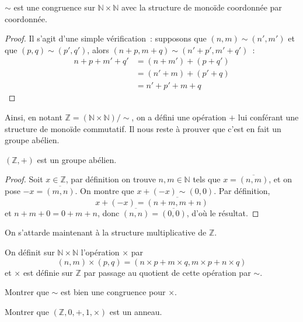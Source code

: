 \begin{proposition}
  $\sim$ est une congruence sur $\mathbb N \times \mathbb N$ avec la structure
  de monoïde coordonnée par coordonnée.
\end{proposition}

\begin{proof}
  Il s'agit d'une simple vérification~: supposons que $(n,m)\sim(n',m')$ et que
  $(p,q)\sim(p',q')$, alors $(n+p,m+q)\sim(n'+p',m'+q')$~:
  \begin{align*}
    n + p + m' + q' &= (n + m') + (p + q')\\
    &= (n' + m) + (p' + q)\\
    &= n' + p' + m + q
  \end{align*}
\end{proof}

Ainsi, en notant $\mathbb Z = (\mathbb N \times \mathbb N) / \sim$, on a
défini une opération $+$ lui conférant une structure de monoïde commutatif. Il
nous reste à prouver que c'est en fait un groupe abélien.

\begin{proposition}
  $(\mathbb Z,+)$ est un groupe abélien.
\end{proposition}

\begin{proof}
  Soit $x \in \mathbb Z$, par définition on trouve $n,m\in\mathbb N$ tels que
  $x = \overline{(n,m)}$, et on pose $-x = \overline{(m,n)}$. On montre que
  $x + (-x) \sim (0,0)$. Par définition,
  \[x + (-x) = \overline{(n + m, m + n)}\]
  et $n + m + 0 = 0 + m + n$, donc $\overline{(n,n)}=\overline{(0,0)}$, d'où le
  résultat.
\end{proof}

On s'attarde maintenant à la structure multiplicative de $\mathbb Z$.

\begin{definition}
  On définit sur $\mathbb N\times \mathbb N$ l'opération $\times$ par
  \[(n,m)\times(p,q) = (n\times p + m \times q, m \times p + n \times q)\]
  et $\times$ est définie sur $\mathbb Z$ par passage au quotient de cette
  opération par $\sim$.
\end{definition}

\begin{exercise}
  Montrer que $\sim$ est bien une congruence pour $\times$.
\end{exercise}

\begin{exercise}
  Montrer que $(\mathbb Z,0,+,1,\times)$ est un anneau.
\end{exercise}

